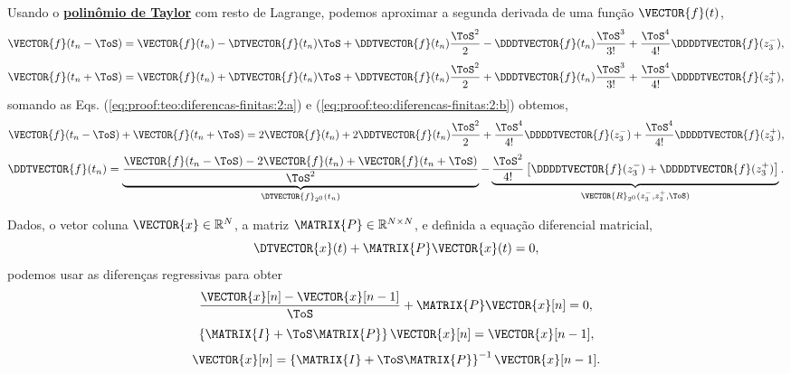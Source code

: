 \begin{myproofT}\label{proof:teo:diferenças-finitas:2}
Usando o \hyperref[prop:polytaylor]{\textbf{polinômio de Taylor}} com resto de Lagrange, podemos aproximar 
a segunda derivada de uma função $\VECTOR{f}(t)$,
\begin{equation}\label{eq:proof:teo:diferencas-finitas:2:a}
\VECTOR{f}(t_n-\ToS) = 
\VECTOR{f}(t_n)-\DTVECTOR{f}(t_n)\ToS +\DDTVECTOR{f}(t_n) \frac{\ToS^2}{2}-\DDDTVECTOR{f}(t_n) \frac{\ToS^3}{3!} +\frac{\ToS^4}{4!}\DDDDTVECTOR{f}(z_{3}^{-}),
\end{equation}
\begin{equation}\label{eq:proof:teo:diferencas-finitas:2:b}
\VECTOR{f}(t_n+\ToS) = 
\VECTOR{f}(t_n)+\DTVECTOR{f}(t_n)\ToS +\DDTVECTOR{f}(t_n) \frac{\ToS^2}{2}+\DDDTVECTOR{f}(t_n) \frac{\ToS^3}{3!} +\frac{\ToS^4}{4!}\DDDDTVECTOR{f}(z_{3}^{+}),
\end{equation}
somando as Eqs. (\ref{eq:proof:teo:diferencas-finitas:2:a}) e (\ref{eq:proof:teo:diferencas-finitas:2:b}) obtemos,
\begin{equation}
\VECTOR{f}(t_n-\ToS) + \VECTOR{f}(t_n+\ToS) = 2 \VECTOR{f}(t_n)+2\DDTVECTOR{f}(t_n) \frac{\ToS^2}{2}+\frac{\ToS^4}{4!}\DDDDTVECTOR{f}(z_{3}^{-}) +\frac{\ToS^4}{4!}\DDDDTVECTOR{f}(z_{3}^{+}),
\end{equation}
\begin{equation}
 \DDTVECTOR{f}(t_n) =
\underbrace{\frac{\VECTOR{f}(t_n-\ToS) -2 \VECTOR{f}(t_n) + \VECTOR{f}(t_n+\ToS)}{\ToS^2}}_{\DTVECTOR{f}_{2^{0}}(t_n)}
-\underbrace{\frac{\ToS^2}{4!}\left[\DDDDTVECTOR{f}(z_{3}^{-}) +\DDDDTVECTOR{f}(z_{3}^{+})\right]}_{\VECTOR{R}_{2^{0}}(z_{3}^{-},z_{3}^{+},\ToS)}.
\end{equation}
\end{myproofT}



\begin{myproofT}\label{proof:theo:differential-eq-discreto:order1:0}
Dados, o vetor coluna $\VECTOR{x} \in \mathbb{R}^N$, a matriz $\MATRIX{P} \in \mathbb{R}^{N\times N}$, 
e definida a equação diferencial matricial,
\begin{equation}
\DTVECTOR{x}(t) + \MATRIX{P} \VECTOR{x}(t)=0,
\end{equation}
podemos usar as diferenças regressivas para obter
\begin{equation}
\frac{\VECTOR{x}[n]-\VECTOR{x}[n-1]}{\ToS} + \MATRIX{P} \VECTOR{x}[n]=0,
\end{equation}
\begin{equation}
\left\{\MATRIX{I}  + \ToS \MATRIX{P}\right\} \VECTOR{x}[n]=\VECTOR{x}[n-1],
\end{equation}
\begin{equation}
\VECTOR{x}[n]=\left\{\MATRIX{I}  + \ToS \MATRIX{P}\right\}^{-1}\VECTOR{x}[n-1].
\end{equation}
\end{myproofT}

